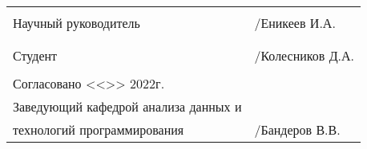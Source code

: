 \documentclass[a4paper,12pt]{extarticle}
\begin{document}
    \vfill

    \begin{xltabular}{\textwidth} {
            >{\hsize} X
            >{\hsize} X }
         \\
        Научный руководитель & \underline{\hspace{3cm}}/Еникеев И.А. \\
        & \\
         \\
        Студент & \underline{\hspace{3cm}}/Колесников Д.А. \\
        & \\
        Согласовано <<\underline{\hspace{1cm}}>>\underline{\hspace{3cm}} 2022г. & \\
        Заведующий кафедрой анализа данных и & \\
        технологий программирования & \underline{\hspace{3cm}}/Бандеров В.В. \\
    \end{xltabular}
\end{document}
